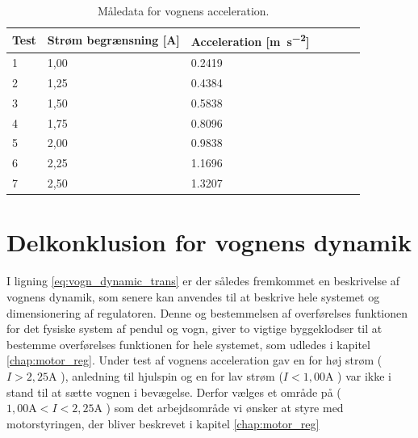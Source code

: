 \begin{table}[h!]
	\small
	\centering
	\caption{Måledata for vognens acceleration.}
	\label{tab:maaldata_vogn}
	\begin{threeparttable}
		\begin{tabular}{ l l l l l l l }
			\toprule
			\multicolumn{1}{l}{\textbf{Test}}       &
			\multicolumn{1}{l}{\textbf{Strøm begrænsning [\si{\ampere}]}}       &
			\multicolumn{1}{l}{\textbf{Acceleration [\si{\meter\per\second\squared}]}}   \\ 
			\hline
			1 &  1,00  &  \num{0.2419}  \\
			2 &  1,25  &  \num{0.4384}  \\
			3 &  1,50  &  \num{0.5838}  \\
			4 &  1,75  &  \num{0.8096}  \\
			5 &  2,00  &  \num{0.9838}  \\
			6 &  2,25  &  \num{1.1696}  \\
			7 &  2,50  &  \num{1.3207}  \\
			\hline
			\bottomrule
		\end{tabular}
	\end{threeparttable}
\end{table} 

\section{Delkonklusion for vognens dynamik}

I ligning \ref{eq:vogn_dynamic_trans} er der således fremkommet en beskrivelse af vognens dynamik, som senere kan anvendes til at beskrive hele systemet og dimensionering af regulatoren.
Denne og bestemmelsen af overførelses funktionen for det fysiske system af pendul og vogn, giver to vigtige byggeklodser til at bestemme overførelses funktionen for hele systemet, som udledes i kapitel \ref{chap:motor_reg}.
Under test af vognens acceleration gav en for høj strøm ($I > 2,25 \si{\ampere} $ ), anledning til hjulspin og en for lav strøm ($I < 1,00 \si{\ampere} $ ) var ikke i stand til at sætte vognen i bevægelse.
Derfor vælges et område på ($ 1,00 \si{\ampere} <  I < 2,25 \si{\ampere} $ ) som det arbejdsområde vi ønsker at styre med motorstyringen, der bliver beskrevet i kapitel \ref{chap:motor_reg}



 